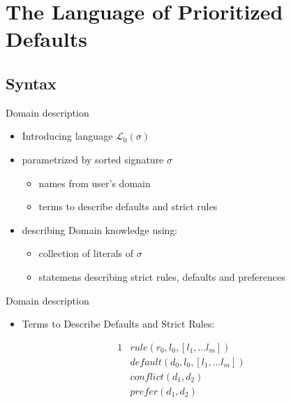 \documentclass{beamer}
\begin{document}
\section{The Language of Prioritized Defaults}

  \subsection{Syntax}


  \begin{frame}{Domain description}
    \begin{itemize}
      \item Introducing language $\mathcal{L}_0(\sigma)$
      \item parametrized by sorted signature $\sigma$
      \begin{itemize}
        \item names from user's domain
        \item terms to describe defaults and strict rules
      \end{itemize}
      \item describing Domain knowledge using: 
      \begin{itemize}
        \item collection of literals of $\sigma$
        \item statemens describing strict rules, defaults and preferences
      \end{itemize}
    \end{itemize}
  \end{frame}

  \begin{frame}{Domain description}
    \begin{itemize}
      \item Terms to Describe Defaults and Strict Rules:
    \end{itemize}

    \begin{alignat}{1}
    & \label{item:rule1} rule(r_0, l_0, [l_1, \dots l_m]) \\
    & \label{item:rule2} default(d_0, l_0, [l_1, \dots l_m]) \\
    & \label{item:rule3} conflict(d_1, d_2) \\
    & \label{item:rule4} prefer(d_1, d_2)
    \end{alignat}
  \end{frame}
  
\end{document}
